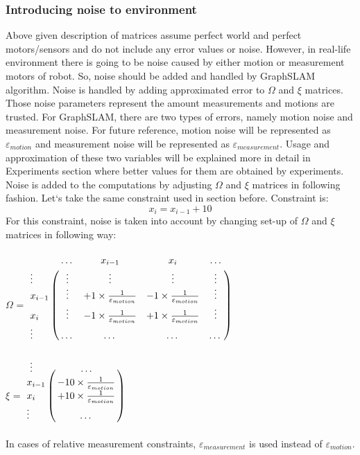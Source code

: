 \documentclass{ba-kecs}
\numberwithin{figure}{section}
\numberwithin{equation}{section}
\begin{document}
\subsubsection{Introducing noise to environment}
Above given description of matrices assume perfect world and perfect motors/sensors and do not include any error values or noise. However, in real-life environment there is going to be noise caused by either motion or measurement motors of robot. So, noise should be added and handled by GraphSLAM algorithm. Noise is handled by adding approximated error to $\Omega$ and $\xi$ matrices. Those noise parameters represent the amount measurements and motions are trusted. For GraphSLAM, there are two types of errors, namely motion noise and measurement noise. For future reference, motion noise will be represented as $\varepsilon_{motion}$ and measurement noise will be represented as $\varepsilon_{measurement}$. Usage and approximation of these two variables will be explained more in detail in Experiments section where better values for them are obtained by experiments. Noise is added to the computations by adjusting $\Omega$ and $\xi$ matrices in following fashion. Let`s take the same constraint used in section before. Constraint is:
\[ x_{i} = x_{i-1} + 10 \]
For this constraint, noise is taken into account by changing set-up of $\Omega$ and $\xi$ matrices in following way:\\ \\

$\Omega$ = $\bordermatrix{~ & \dots & x_{i-1} & x_{i} & \dots \cr
							\vdots & \vdots & \vdots & \vdots & \vdots \cr
                  			x_{i-1} & \vdots & +1 \times \frac{1}{\varepsilon_{motion}} & -1 \times \frac{1}{\varepsilon_{motion}} & \vdots \cr
                  			x_{i} & \vdots & -1 \times \frac{1}{\varepsilon_{motion}} & +1 \times \frac{1}{\varepsilon_{motion}} & \vdots \cr
                  			\vdots & \dots & \dots & \dots & \dots \cr}$ \\ \\
                  			
    $\xi$ = $\bordermatrix{~ \vdots & \dots \cr
                  			x_{i-1} & -10 \times \frac{1}{\varepsilon_{motion}} \cr
                  			x_{i}  & +10 \times \frac{1}{\varepsilon_{motion}} \cr
                  			\vdots & \dots \cr}$\\ \\
                  			
In cases of relative measurement constraints, $\varepsilon_{measurement}$ is used instead of $\varepsilon_{motion}$.
	
\end{document}
